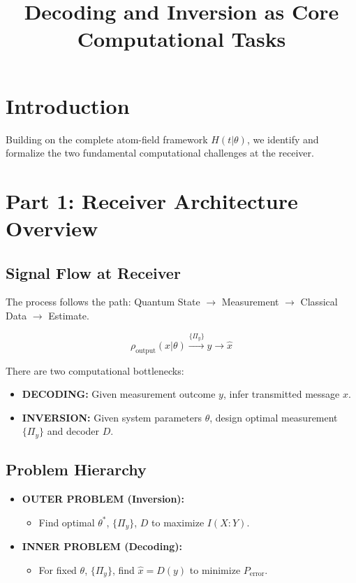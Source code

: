 \documentclass[11pt,a4paper]{article}
\title{Decoding and Inversion as Core Computational Tasks}
\author{}
\date{}
\begin{document}
\maketitle

\section*{Introduction}

Building on the complete atom-field framework $H(t|\theta)$, we identify and formalize the two fundamental computational challenges at the receiver.

\section{Part 1: Receiver Architecture Overview}

\subsection{Signal Flow at Receiver}

The process follows the path: Quantum State $\rightarrow$ Measurement $\rightarrow$ Classical Data $\rightarrow$ Estimate.

\begin{equation}
\rho_{\text{output}}(x|\theta) \xrightarrow{\{\Pi_y\}} y \rightarrow \hat{x}
\end{equation}

There are two computational bottlenecks:
\begin{itemize}
    \item \textbf{DECODING:} Given measurement outcome $y$, infer transmitted message $x$.
    \item \textbf{INVERSION:} Given system parameters $\theta$, design optimal measurement $\{\Pi_y\}$ and decoder $D$.
\end{itemize}

\subsection{Problem Hierarchy}

\begin{itemize}
    \item \textbf{OUTER PROBLEM (Inversion):}
    \begin{itemize}
        \item Find optimal $\theta^*$, $\{\Pi_y\}$, $D$ to maximize $I(X : Y)$.
    \end{itemize}
    \item \textbf{INNER PROBLEM (Decoding):}
    \begin{itemize}
        \item For fixed $\theta$, $\{\Pi_y\}$, find $\hat{x} = D(y)$ to minimize $P_{\text{error}}$.
    \end{itemize}
\end{itemize}
\end{document}
